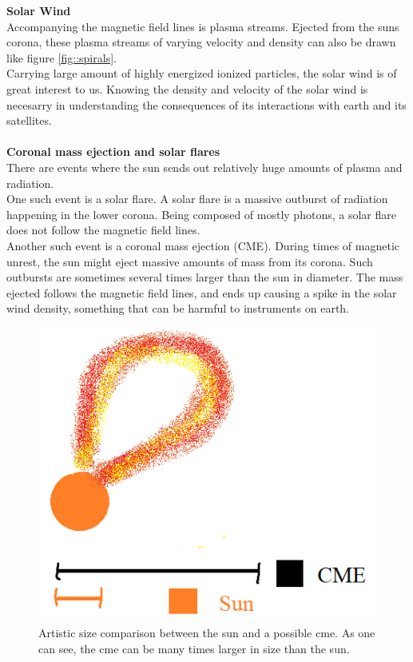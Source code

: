 \documentclass[norsk,a4paper,11pt]{article}
\begin{document}
\begin{multicols}{2}
		\textbf{Solar Wind}\\
		Accompanying the magnetic field lines is plasma streams. Ejected from the suns corona, these plasma streams of varying velocity and density can also                         		be drawn like figure \ref{fig::spirals}.\\
		Carrying large amount of highly energized ionized particles, the solar wind is of great interest to us. Knowing the density and velocity of the solar wind 				is necesarry in understanding the consequences of its interactions with earth and its satellites.\\
		\\
		\textbf{Coronal mass ejection and solar flares}\\
		There are events where the sun sends out relatively huge amounts of plasma and radiation.\\
		One such event is a solar flare. A solar flare is a massive outburst of radiation happening in the lower corona. Being composed of mostly photons, a 				solar flare does not follow the magnetic field lines.\\
		Another such event is a coronal mass ejection (CME). During times of magnetic unrest, the sun might eject massive amounts of mass from its corona. 				Such outbursts are sometimes several times larger than the sun in diameter. The mass ejected follows the magnetic field lines, and ends up causing a 		spike in the solar wind density, something that can be harmful to instruments on earth.
		\begin{figure}[H]
			\includegraphics[scale = 0.7]{Figures/artistic_cme.png}
			\centering
			\caption{Artistic size comparison between the sun and a possible cme. As one can see, the cme can be many times larger in size than the sun.}
			\label{fig::cme}
		\end{figure}


\end{multicols}
\end{document}
